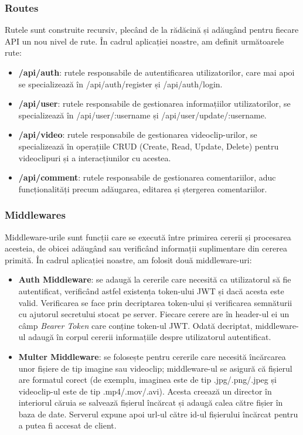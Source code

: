 \subsubsection{Routes}
Rutele sunt construite recursiv, plecând de la rădăcină și adăugând pentru fiecare API 
un nou nivel de rute. În cadrul aplicației noastre, am definit următoarele rute:

\begin{itemize}
    \item \textbf{/api/auth}: rutele responsabile de autentificarea utilizatorilor, care mai apoi 
    se specializează în /api/auth/register și /api/auth/login.
    \item \textbf{/api/user}: rutele responsabile de gestionarea informațiilor utilizatorilor, se 
    specializează în /api/user/:username și /api/user/update/:username.
    \item \textbf{/api/video}: rutele responsabile de gestionarea videoclip-urilor, se specializează
    în operațiile CRUD (Create, Read, Update, Delete) pentru videoclipuri și a interacțiunilor cu acestea.
    \item \textbf{/api/comment}: rutele responsabile de gestionarea comentariilor, aduc funcționalități
    precum adăugarea, editarea și ștergerea comentariilor.
\end{itemize}

\subsubsection{Middlewares}
Middleware-urile sunt funcții care se execută între primirea cererii și procesarea acesteia,
de obicei adăugând sau verificând informații suplimentare din cererea primită. În cadrul
aplicației noastre, am folosit două middleware-uri:

\begin{itemize}
    \item \textbf{Auth Middleware}: se adaugă la cererile care necesită ca utilizatorul să fie
    autentificat, verificând astfel existența token-ului JWT și dacă acesta este valid. Verificarea
    se face prin decriptarea token-ului și verificarea semnăturii cu ajutorul secretului stocat
    pe server. Fiecare cerere are în header-ul ei un câmp \textit{Bearer Token} care conține
    token-ul JWT. Odată decriptat, middleware-ul adaugă în corpul cererii informațiile despre
    utilizatorul autentificat.
    \item \textbf{Multer Middleware}: se folosește pentru cererile care necesită încărcarea unor
    fișiere de tip imagine sau videoclip; middleware-ul se asigură că fișierul are formatul corect
    (de exemplu, imaginea este de tip .jpg/.png/.jpeg și videoclip-ul este de tip .mp4/.mov/.avi).
    Acesta creează un director în interiorul căruia se salvează fișierul încărcat și adaugă
    calea către fișier în baza de date. Serverul expune apoi url-ul către id-ul fișierului
    încărcat pentru a putea fi accesat de client.
    
\end{itemize}

